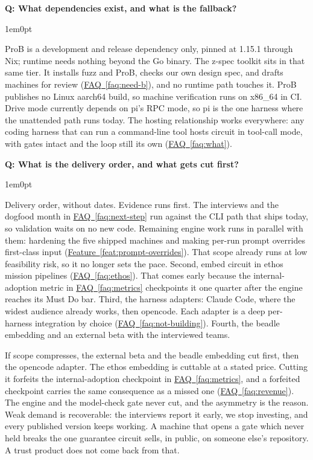 \documentclass[11pt,letterpaper]{article}
\newcounter{faqnum}
\newenvironment{faqpair}[1]{%
  \needspace{4\baselineskip}%
  \vspace{0.5em}%
  \refstepcounter{faqnum}%
  \noindent\textbf{\color{SectionBlue}Q\thefaqnum: #1}\par\nopagebreak[4]%
  \vspace{0.2em}%
  \begin{adjustwidth}{1em}{0pt}%
  \setlength{\parindent}{0pt}%
}{%
  \end{adjustwidth}%
  \vspace{0.5em}%
}
\newcommand{\faqref}[1]{\hyperref[#1]{FAQ~\ref*{#1}}}
\newcommand{\featureref}[1]{\hyperref[#1]{Feature~\ref*{#1}}}
\begin{document}
\begin{faqpair}{What dependencies exist, and what is the fallback?}
\label{faq:dependencies}
  ProB is a development and release dependency only, pinned at 1.15.1 through Nix; runtime needs nothing beyond the Go binary. The z-spec toolkit sits in that same tier. It installs fuzz and ProB, checks our own design spec, and drafts machines for review (\faqref{faq:need-b}), and no runtime path touches it. ProB publishes no Linux aarch64 build, so machine verification runs on x86\_64 in CI. Drive mode currently depends on pi's RPC mode, so pi is the one harness where the unattended path runs today. The hosting relationship works everywhere: any coding harness that can run a command-line tool hosts circuit in tool-call mode, with gates intact and the loop still its own (\faqref{faq:what}).
\end{faqpair}

\begin{faqpair}{What is the delivery order, and what gets cut first?}
\label{faq:timeline}
  Delivery order, without dates. Evidence runs first. The interviews and the dogfood month in \faqref{faq:next-step} run against the CLI path that ships today, so validation waits on no new code. Remaining engine work runs in parallel with them: hardening the five shipped machines and making per-run prompt overrides first-class input (\featureref{feat:prompt-overrides}). That scope already runs at low feasibility risk, so it no longer sets the pace. Second, embed circuit in ethos mission pipelines (\faqref{faq:ethos}). That comes early because the internal-adoption metric in \faqref{faq:metrics} checkpoints it one quarter after the engine reaches its Must Do bar. Third, the harness adapters: Claude Code, where the widest audience already works, then opencode. Each adapter is a deep per-harness integration by choice (\faqref{faq:not-building}). Fourth, the beadle embedding and an external beta with the interviewed teams.

  If scope compresses, the external beta and the beadle embedding cut first, then the opencode adapter. The ethos embedding is cuttable at a stated price. Cutting it forfeits the internal-adoption checkpoint in \faqref{faq:metrics}, and a forfeited checkpoint carries the same consequence as a missed one (\faqref{faq:revenue}). The engine and the model-check gate never cut, and the asymmetry is the reason. Weak demand is recoverable: the interviews report it early, we stop investing, and every published version keeps working. A machine that opens a gate which never held breaks the one guarantee circuit sells, in public, on someone else's repository. A trust product does not come back from that.
\end{faqpair}
\end{document}
